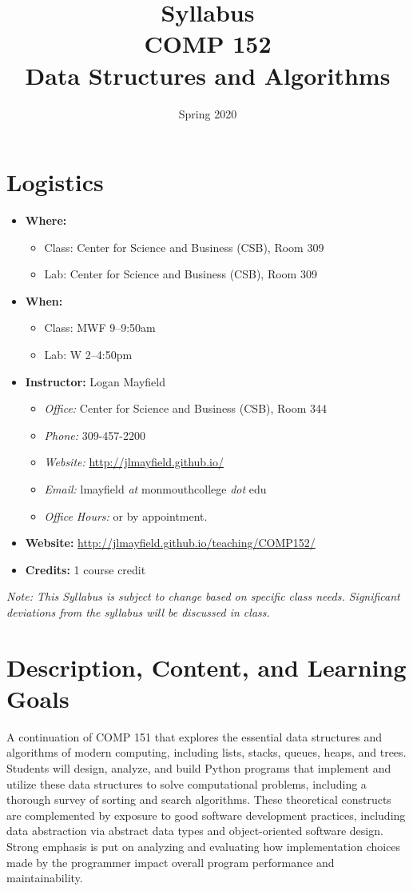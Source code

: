 \documentclass[10pt]{article}
\title{Syllabus \\ COMP 152 \\ Data Structures and Algorithms}
\author{  }
\date{Spring 2020}
\begin{document}
\maketitle

\section{Logistics}
\begin{itemize}
\item \textbf{Where: }
\begin{itemize}
\item Class: Center for Science and Business (CSB), Room 309
\item Lab: Center for Science and Business (CSB), Room 309
\end{itemize}
\item \textbf{When: }
\begin{itemize}
  \item Class: MWF 9--9:50am
  \item Lab: W 2--4:50pm
\end{itemize}
\item \textbf{Instructor: } Logan Mayfield
\begin{itemize}
\item \textit{Office: } Center for Science and Business (CSB), Room 344
\item \textit{Phone: } 309-457-2200 %
\item \textit{Website: } \url{http://jlmayfield.github.io/}
\item \textit{Email: } lmayfield \textit{at} monmouthcollege \textit{dot} edu
\item \textit{Office Hours: }   or by appointment.
\end{itemize}
\item \textbf{Website: } \url{http://jlmayfield.github.io/teaching/COMP152/}
\item \textbf{Credits: } 1 course credit
\end{itemize}
\emph{Note: This Syllabus is subject to change based on specific class needs. Significant deviations from the syllabus will be discussed in class.}


\section{Description, Content, and Learning Goals}

A continuation of COMP 151 that explores the essential data structures
and algorithms of modern computing, including lists, stacks, queues,
heaps, and trees. Students will design, analyze, and build Python
programs that implement and utilize these data structures to solve
computational problems, including a thorough survey of sorting and
search algorithms. These theoretical constructs are complemented by
exposure to good software development practices, including data
abstraction via abstract data types and object-oriented software
design. Strong emphasis is put on analyzing and evaluating how
implementation choices made by the programmer impact overall program
performance and maintainability.
\end{document}
